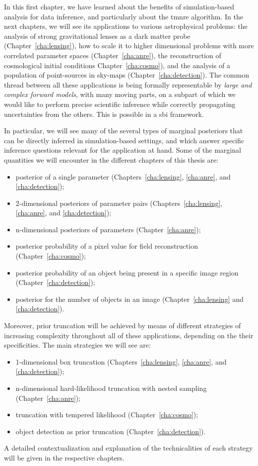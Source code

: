 In this first chapter, we have learned about the benefits of simulation-based analysis for data inference, and particularly about the \gls*{tmnre} algorithm. In the next chapters, we will see its applications to various astrophysical problems: the analysis of strong gravitational lenses as a dark matter probe (Chapter~\ref{cha:lensing}), how to scale it to higher dimensional problems with more correlated parameter spaces (Chapter~\ref{cha:anre}), the reconstruction of cosmological initial conditions Chapter~\ref{cha:cosmo}), and the analysis of a population of point-sources in sky-maps (Chapter~\ref{cha:detection}). The common thread between all these applications is being formally representable by \emph{large and complex forward models}, with many moving parts, on a subpart of which we would like to perform precise scientific inference while correctly propagating uncertainties from the others. This is possible in a \gls*{sbi} framework.

In particular, we will see many of the several types of marginal posteriors that can be directly inferred in simulation-based settings, and which answer specific inference questions relevant for the application at hand. Some of the marginal quantities we will encounter in the different chapters of this thesis are:
\begin{itemize}[leftmargin=1cm]
	\item posterior of a single parameter (Chapters~\ref{cha:lensing}, \ref{cha:anre}, and \ref{cha:detection});
	\item 2-dimensional posteriors of parameter pairs (Chapters~\ref{cha:lensing}, \ref{cha:anre}, and \ref{cha:detection});
	\item n-dimensional posteriors of parameters (Chapter~\ref{cha:anre});
	\item posterior probability of a pixel value for field reconstruction (Chapter~\ref{cha:cosmo});
    \item posterior probability of an object being present in a specific image region (Chapter~\ref{cha:detection});
	\item posterior for the number of objects in an image  (Chapter~\ref{cha:lensing} and \ref{cha:detection}).
\end{itemize}


Moreover, prior truncation will be achieved by means of different strategies of increasing complexity throughout all of these applications, depending on the their specificities. The main strategies we will see are:
\begin{itemize}[leftmargin=1cm]
	\item 1-dimensional box truncation (Chapters~\ref{cha:lensing}, \ref{cha:anre}, and \ref{cha:detection});
	\item n-dimensional hard-likelihood truncation with nested sampling  (Chapter~\ref{cha:anre});
	\item truncation with tempered likelihood  (Chapter~\ref{cha:cosmo});
	\item object detection as prior truncation  (Chapter~\ref{cha:detection}).
\end{itemize}

A detailed contextualization and explanation of the technicalities of each strategy will be given in the respective chapters. 







